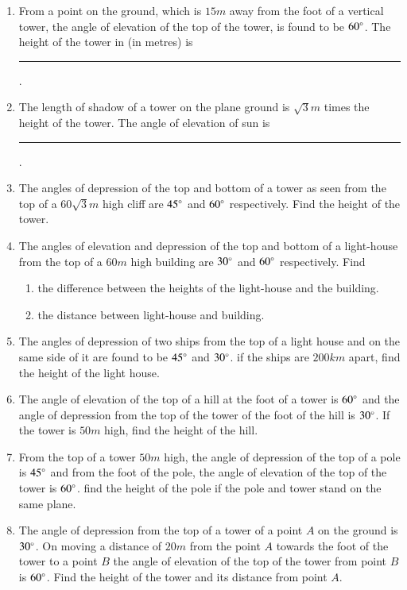 \begin{enumerate}[label=\thesubsection.\arabic*.,ref=\thesubsection.\theenumi]
\hfill{}\item From a point on the ground, which is $15{ m}$ away from the foot of a vertical tower, the angle of elevation of the top of the tower, is found to be $60\degree$. The height of the tower in (in metres) is 
\rule{1cm}{0.1pt}.
\hfill{}\item The length of shadow of a tower on the plane ground is $\sqrt 3 m$ times the height of the tower. The angle of elevation of sun is  \rule{1cm}{0.1pt}.
\hfill{}\item The angles of depression of the top and bottom of a tower as seen from the top of a $60\sqrt 3 { m}$ high cliff are $45\degree$ and $60\degree$ respectively. Find the height of the tower. 
\hfill{}
\item The angles of elevation and depression of the top and bottom of a light-house from the top of a $60 { m}$ high building are $30\degree$ and $60\degree$ respectively. Find 
\hfill{}
\begin{enumerate}
\item the difference between the heights of the light-house and the building. 
\item the distance between light-house and building. 
\end{enumerate}
\item The angles of depression of two ships from the top of a light house and on the same side of it are found to be $45\degree$ and $30\degree$. if the ships are $200 { km}$ apart, find the height of the light house. 
\hfill{}\item The angle of elevation of the top of a hill at the foot of a tower is $60\degree$ and the angle of depression from the top of the tower of the foot of the hill is $30\degree$. If the tower is $50{ m}$ high, find the height of the hill. 
\hfill{}\item From the top of a tower $50{ m}$ high, the angle of depression of the top of a pole is $45\degree$ and from the foot of the pole, the angle of elevation of the top of the tower is $60\degree$. find the height of the pole if the pole and tower stand on the same plane. 
\hfill{}\item The angle of depression from the top of a tower of a point $A$ on the ground is $30\degree$. On moving a distance of $20{ m}$ from the point $A$ towards the foot of the tower to a point $B$ the angle of elevation of the top of the tower from point $B$ is $60\degree$. Find the height of the tower and its distance from point $A$.

\end{enumerate}
